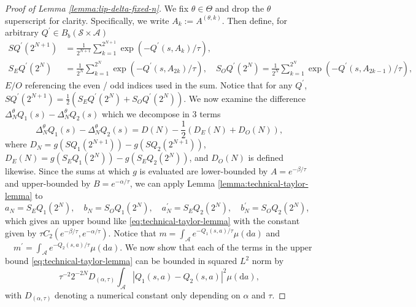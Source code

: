 \documentclass[11pt]{article}
\numberwithin{equation}{section}
\theoremstyle{definition}
\theoremstyle{remark}
\def\diff{{\mathrm{d}}}
\begin{document}
\begin{proof}[Proof of Lemma \ref{lemma:lip-delta-fixed-n}]
    We fix $\theta \in \Theta$ and drop the $\theta$ superscript for clarity. Specifically, we write $A_k := A^{(\theta,k)}$. Then define, for arbitrary $Q^\prime \in B_b (\mathcal S \times \mathcal A)$
    \begin{align*}
        SQ^\prime(2^{N + 1})  &= \frac{1}{2^{N+1}}\sum_{k = 1}^{2^{N+1}} \exp \left(-Q^\prime(s,A_k) / \tau \right),  \\
        S_EQ^\prime(2^N)      &= \frac{1}{2^{N}}\sum_{k = 1}^{2^{N}} \exp \left(-Q^\prime(s,A_{2k}) / \tau \right),   \quad S_OQ^\prime (2^N)     = \frac{1}{2^{N}}\sum_{k = 1}^{2^{N}} \exp \left(-Q^\prime(s,A_{2k-1}) / \tau \right),
    \end{align*}
    $E/O$ referencing the even / odd indices used in the sum. Notice that for any $Q^\prime$, $SQ^\prime(2^{N + 1}) = \frac{1}{2}(S_EQ^\prime(2^{N}) + S_OQ^\prime(2^{N}))$. We now examine the difference $\Delta_N^\theta Q_1(s) - \Delta_N ^\theta Q_2(s)$ which we decompose in 3 terms
    \begin{equation*}
        \label{eq:delta-decomp}
        \Delta_N^\theta Q_1(s) - \Delta_N ^\theta Q_2(s) = D(N) - \frac{1}{2}(D_{E}(N) + D_{O}(N)),
    \end{equation*}
    where $D_N = g(SQ_1(2^{N + 1})) - g (SQ_2(2^{N+1}))$, $D_{E}(N) = g(S_EQ_1(2^N)) - g (S_EQ_2(2^N))$, and $D_{O}(N)$ is defined likewise.
    Since the sums at which $g$ is evaluated are lower-bounded by $A =e^{-\beta / \tau}$ and upper-bounded by $B = e^{-\alpha / \tau}$, we can apply Lemma \ref{lemma:technical-taylor-lemma} to $a_N = S_EQ_1(2^N), \quad b_N = S_OQ_1(2^N), \quad a^\prime_N = S_E Q_2(2^N), \quad b^\prime_N = S_O Q_2(2^N)$,
    which gives an upper bound like \eqref{eq:technical-taylor-lemma} with the constant given by $ \tau C_2(e^{-\beta / \tau}, e^{-\alpha / \tau})$.
    Notice that 
    $
    m = \int_{\mathcal A} e^{-Q_1(s,a)/ \tau} \mu (\diff a)$ 
    and 
    $\quad m^\prime = \int_{\mathcal A} e^{-Q_2(s,a)/ \tau} \mu (\diff a)
    $.
    We now show that each of the terms in the upper bound \eqref{eq:technical-taylor-lemma} can be bounded in squared $L^2$ norm by 
    $$
    \tau^{-2} 2^{-2N}D_{(\alpha,\tau)}\int_{\mathcal A} |Q_1(s,a) - Q_2(s,a)|^2 \mu (\diff a),
    $$ 
    with $D_{(\alpha,\tau)}$ denoting a numerical constant only depending on $\alpha$ and $\tau$. 


\end{proof}
\end{document}
